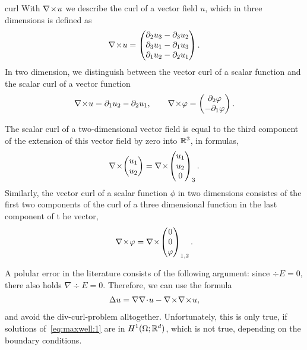 \begin{Notation}{curl}
  With $\nabla\!\times\! u$ we describe the curl of a vector field $u$, which in
  three dimensions is defined as
  \begin{gather}
    \label{eq:maxwell:2}
    \nabla\!\times\! u =
    \begin{pmatrix}
      \partial_2u_3-\partial_3u_2\\\partial_3u_1-\partial_1u_3\\\partial_1u_2-\partial_2u_1
    \end{pmatrix}.
  \end{gather}
  In two dimension, we distinguish between the vector curl of a scalar
  function and the scalar curl of a vector function
  \begin{gather}
    \nabla\!\times\! u = \partial_1u_2-\partial_2u_1,
    \qquad
    \nabla\!\times\! \varphi =
    \begin{pmatrix}
      \partial_2 \varphi \\ -\partial_1\varphi
    \end{pmatrix}.
  \end{gather}
\end{Notation}

\begin{remark}
  The scalar curl of a two-dimensional vector field is equal to the
  third component of the extension of this vector field by zero into
  $\mathbb R^3$, in formulas,
  \begin{gather*}
    \nabla\!\times\!
    \begin{pmatrix}
      u_1\\u_2
    \end{pmatrix}
    =
    \nabla\!\times\!
    \begin{pmatrix}
      u_1\\u_2\\0
    \end{pmatrix}_3.
  \end{gather*}
  Similarly, the vector curl of a scalar function $\phi$ in two dimensions
  consistes of the first two components of the curl of a three
  dimensional function in the last component of t he vector,
  \begin{gather*}
    \nabla\!\times\! \varphi = \nabla\!\times\!
    \begin{pmatrix}
      0\\0\\\varphi
    \end{pmatrix}_{1,2}.
  \end{gather*}
\end{remark}
\begin{remark}
  A polular error in the literature consists of the following
  argument: since $\div E = 0$, there also holds $\nabla \div E =
  0$. Therefore, we can use the formula
  \begin{gather*}
    \Delta u = \nabla\nabla\!\cdot\! u - \nabla\!\times\!\nabla\!\times\! u,
  \end{gather*}
  and avoid the div-curl-problem alltogether. Unfortunately, this is
  only true, if solutions of~\eqref{eq:maxwell:1} are in
  $H^1(\Omega;\mathbb R^d)$, which is not true, depending on the boundary
  conditions.
\end{remark}

